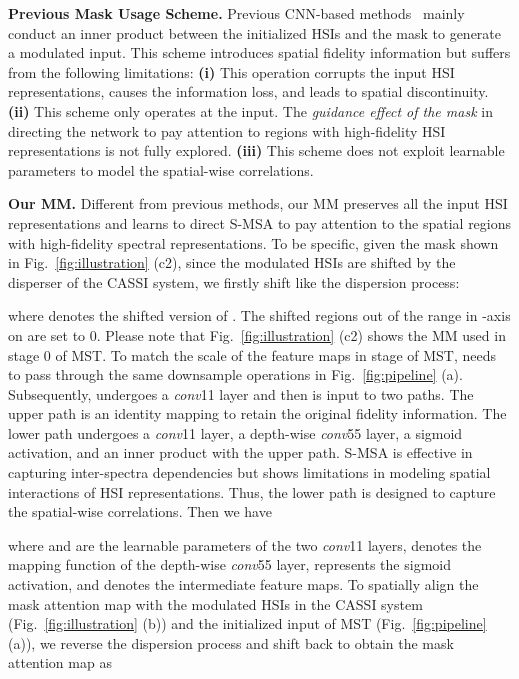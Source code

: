 \documentclass[10pt,twocolumn,letterpaper]{article}
\begin{document}
\noindent\textbf{Previous Mask Usage Scheme.}  Previous CNN-based methods~\cite{tsa_net,resu,gapnet,self} mainly conduct an inner product between the initialized HSIs  and the mask  to generate a modulated input. This scheme introduces spatial fidelity information but suffers from the following limitations: \textbf{(i)} This operation corrupts the input HSI representations, causes the information loss, and leads to spatial discontinuity. \textbf{(ii)} This scheme only operates at the input. The \emph{guidance effect of the mask} in directing the network to pay attention to regions with high-fidelity HSI representations is not fully explored. \textbf{(iii)} This scheme does not exploit learnable parameters to model the spatial-wise correlations.


\noindent\textbf{Our MM.}  Different from previous methods, our MM preserves all the input HSI representations and learns to direct S-MSA to pay attention to the spatial regions with high-fidelity spectral representations. To be specific, given the mask  shown in Fig.~\ref{fig:illustration} (c2), since the modulated HSIs are shifted by the disperser of the CASSI system, we firstly shift  like the dispersion process:
\vspace{-1.6mm}

where  denotes the shifted version of . The shifted regions out of the range in -axis on  are set to 0. Please note that  Fig.~\ref{fig:illustration} (c2) shows the MM used in stage 0 of MST. To match the scale of the feature maps in stage  of MST,  needs to pass through the same downsample operations in Fig.~\ref{fig:pipeline} (a). Subsequently,  undergoes a \emph{conv}11 layer and then is input to two paths. The upper path is an identity mapping to retain the original fidelity information. The lower path undergoes a \emph{conv}11 layer, a depth-wise  \emph{conv}55 layer, a sigmoid activation, and an inner product with the upper path. S-MSA is effective in capturing inter-spectra dependencies but shows limitations in modeling spatial interactions of HSI representations. Thus, the lower path is designed to capture the spatial-wise correlations. Then we have
\vspace{-1.1mm}

where  and  are the learnable parameters of the two \emph{conv}11 layers,  denotes the mapping function of the depth-wise \emph{conv}55 layer,  represents the sigmoid activation, and  denotes the intermediate feature maps. To spatially align the mask attention map with the modulated HSIs  in the CASSI system (Fig.~\ref{fig:illustration} (b)) and the initialized input  of MST (Fig.~\ref{fig:pipeline} (a)), we reverse the dispersion process and shift back  to obtain the mask attention map  as
\vspace{-1.0mm}
\end{document}
